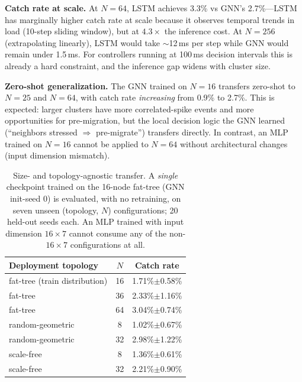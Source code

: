 \documentclass[review,1p]{elsarticle}
\theoremstyle{definition}
\begin{document}
\textbf{Catch rate at scale.}
At $N{=}64$, LSTM achieves 3.3\% vs GNN's 2.7\%---LSTM has marginally
higher catch rate at scale because it observes temporal trends in load
(10-step sliding window), but at $4.3\times$ the inference cost.
At $N{=}256$ (extrapolating linearly), LSTM would take $\sim$12\,ms
per step while GNN would remain under 1.5\,ms.  For controllers
running at 100\,ms decision intervals this is already a hard
constraint, and the inference gap widens with cluster size.

\textbf{Zero-shot generalization.}
The GNN trained on $N{=}16$ transfers zero-shot to $N{=}25$ and
$N{=}64$, with catch rate \emph{increasing} from 0.9\% to 2.7\%.
This is expected: larger clusters have more correlated-spike events
and more opportunities for pre-migration, but the local decision
logic the GNN learned (``neighbors stressed $\Rightarrow$ pre-migrate'')
transfers directly.  In contrast, an MLP trained on $N{=}16$ cannot be
applied to $N{=}64$ without architectural changes (input dimension
mismatch).

\begin{table}[t]
\centering
\caption{Size- and topology-agnostic transfer. A \emph{single} checkpoint
trained on the 16-node fat-tree (GNN init-seed 0) is evaluated, with no
retraining, on seven unseen (topology, $N$) configurations; 20 held-out
seeds each. An MLP trained with input dimension $16{\times}7$ cannot
consume any of the non-$16{\times}7$ configurations at all.}
\label{tab:transfer}
\begin{tabular}{lcc}
\toprule
Deployment topology & $N$ & Catch rate \\
\midrule
fat-tree (train distribution) & 16 & 1.71\%$\pm$0.58\% \\
fat-tree & 36 & 2.33\%$\pm$1.16\% \\
fat-tree & 64 & 3.04\%$\pm$0.74\% \\
\midrule
random-geometric & 8  & 1.02\%$\pm$0.67\% \\
random-geometric & 32 & 2.98\%$\pm$1.22\% \\
scale-free & 8  & 1.36\%$\pm$0.61\% \\
scale-free & 32 & 2.21\%$\pm$0.90\% \\
\bottomrule
\end{tabular}
\end{table}
\end{document}
